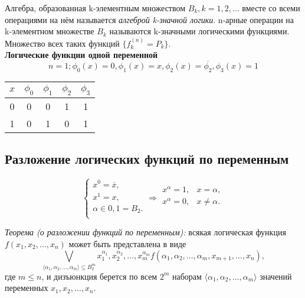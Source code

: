 \documentclass[a4paper,12pt]{report}
\begin{document}
	Алгебра, образованная k-элементным множеством $ B_k, k = 1, 2, \dots $ вместе
	со всеми операциями на нём называется \textit{алгеброй k-значной логики}.
	n-арные операции на k-элементном множестве $ B_k $ называются k-значными
	логическими функциями. Множество всех таких функций $ \{f^{(n)}_k = P_k \} $.
	\\

	\textbf{Логические функции одной переменной}
	$$ n = 1; \phi_0(x) = 0, \phi_1(x) = x, \phi_2(x) = \overline{\phi_2},
	\phi_3(x) = 1 $$

	\begin{center}
		\begin{tabular}{ | c || c | c | c | c | }
			\hline
			$x$ & $\phi_0$ & $\phi_1$ & $\phi_2$ & $\phi_3$ \\
			\hline
			\hline
			0 & 0 & 0 & 1 & 1 \\
			\hline
			1 & 0 & 1 & 0 & 1 \\
			\hline
		\end{tabular}
	\end{center}

\subsection{Разложение логических функций по переменным}

	$$
	\begin{cases}
		x^0 = \overline{x}, \\
		x^1 = x, \\
		\alpha \in 0, 1 = B_2. \\
	\end{cases}
	\Rightarrow
	\begin{aligned}
		x^{\alpha} = 1, & x = \alpha,\\
		x^{\alpha} = 0, & x \neq \alpha.\\
	\end{aligned}
	$$

	\textit{Теорема (о разложении функций по переменным):} всякая логическая
	функция $ f(x_1, x_2, \dots, x_n) $ может быть представлена в виде
	$$ \bigvee_{\langle \alpha_1, \alpha_2, \dots, \alpha_m \rangle \subseteq
	B^m_2}
	x^{\alpha_1}_1, x^{\alpha_2}_2, \dots, x^{\alpha_m}_m
	f(\alpha_1, \alpha_2, \dots, \alpha_m, x_{m+1}, \dots, x_n),$$
	где $ m \leq n $, и дизъюнкция берется по всем $ 2^m $ наборам $ \langle
	\alpha_1, \alpha_2, \dots, \alpha_m \rangle $ значений переменных $ x_1, x_2,
	\dots, x_n $.\\
\end{document}
